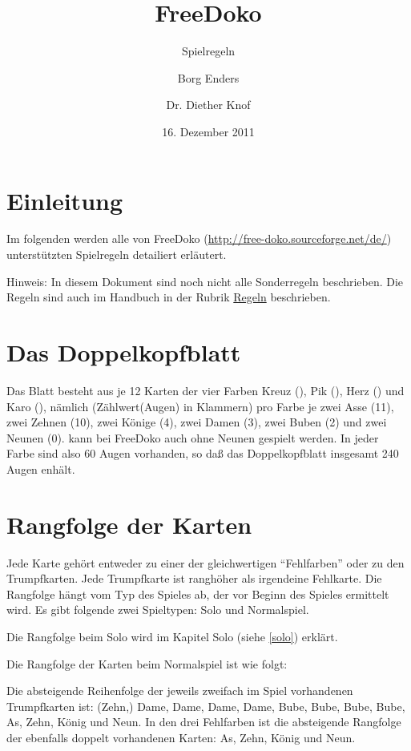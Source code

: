 \documentclass{scrartcl}
\title{FreeDoko}
\subtitle{Spielregeln}
\author{Borg Enders \and Dr. Diether Knof}
\date{16. Dezember 2011}
\begin{document}
\maketitle

\tableofcontents

\section{Einleitung}

Im folgenden werden alle von FreeDoko (\href{http://free-doko.sourceforge.net/de/}{http://free-doko.sourceforge.net/de/}) unterstützten Spielregeln
detailiert erläutert.

Hinweis: In diesem Dokument sind noch nicht alle Sonderregeln beschrieben.
Die Regeln sind auch im Handbuch in der Rubrik \href{http://free-doko.sourceforge.net/doc/manual/de/operation/rules_config.html}{Regeln} beschrieben.


\section{Das Doppelkopfblatt}
Das Blatt besteht aus je 12 Karten der vier Farben Kreuz
(\kreuz), Pik (\pik), Herz (\herz) und Karo (\karo), nämlich
(Zählwert(Augen) in Klammern) pro Farbe je zwei Asse (11), zwei
Zehnen (10), zwei Könige (4), zwei Damen (3), zwei Buben (2) und
zwei Neunen (0). \Optional kann bei FreeDoko auch ohne Neunen
gespielt werden. In jeder Farbe sind also 60 Augen vorhanden, so
daß das Doppelkopfblatt insgesamt 240 Augen enhält.

\section{Rangfolge der Karten}

Jede Karte gehört entweder zu einer der gleichwertigen "`Fehlfarben"' oder zu den Trumpfkarten. Jede Trumpfkarte ist ranghöher als irgendeine Fehlkarte. Die Rangfolge hängt vom Typ des Spieles ab, der vor Beginn des Spieles ermittelt wird. Es gibt folgende zwei Spieltypen: Solo und Normalspiel.

Die Rangfolge beim Solo wird im Kapitel Solo (siehe \ref{solo}) erklärt.

Die Rangfolge der Karten beim Normalspiel ist wie folgt:

Die absteigende Reihenfolge der jeweils zweifach im Spiel vorhandenen Trumpfkarten ist: (\herz Zehn,) \kreuz Dame, \pik Dame, \herz Dame, \karo Dame, \kreuz Bube, \pik Bube, \herz Bube, \karo Bube, \karo As, \karo Zehn, \karo König und \karo Neun. In den drei Fehlfarben ist die absteigende Rangfolge der ebenfalls doppelt vorhandenen Karten: As, Zehn, König und Neun.
\end{document}
